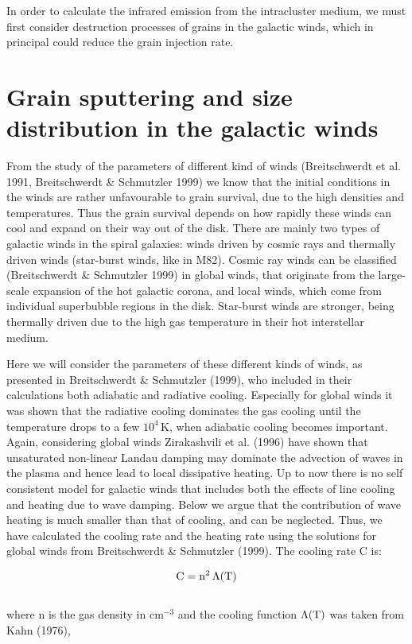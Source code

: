 \documentclass[]{aa}
\begin{document}
In order to  calculate the infrared emission from the intracluster medium, we 
must first consider destruction processes of grains in the galactic winds, 
which in principal could  reduce the grain injection rate.
 
\section{Grain sputtering and size distribution in the galactic winds}

From the study of the parameters of different kind of winds
(Breitschwerdt et al. 1991, Breitschwerdt \& Schmutzler 1999) we know that 
the initial conditions in the
winds are rather unfavourable to grain survival, due to the high densities and
temperatures. Thus the grain survival depends on how rapidly these winds can 
cool
and expand on their way out of the disk. There are mainly two types of galactic
winds in the spiral galaxies: winds driven by cosmic rays and
thermally driven winds (star-burst winds, like in M82). Cosmic
ray winds can be classified (Breitschwerdt \& Schmutzler 1999) in global 
winds, 
that originate from the large-scale expansion of the hot galactic corona, and 
local winds, which come from individual superbubble regions in the disk. 
Star-burst winds are stronger, being thermally driven due to the high gas 
temperature in their hot interstellar medium. 

Here we will consider the parameters of these 
different kinds of winds, as presented
in Breitschwerdt \& Schmutzler (1999), who included in their calculations 
both adiabatic and
radiative cooling. Especially for global winds it was shown that the radiative
cooling dominates the gas cooling until the temperature drops to a few 
$10^4$\,K,
when adiabatic cooling becomes important. Again, considering global winds 
Zirakashvili et al. (1996) have
shown that unsaturated non-linear Landau damping may dominate the advection of
waves in the plasma and hence lead to local dissipative heating. Up to now
there is no self consistent model for galactic winds that includes both the
effects of line cooling and heating due to wave damping. Below we argue that 
the contribution of wave heating is much smaller than that of cooling, and
can be neglected. Thus, we have calculated the cooling rate and the
heating rate using the solutions for global winds from 
Breitschwerdt \& Schmutzler (1999). The cooling rate C is:

\begin{eqnarray}
{\rm C} = {\rm n}^2\,\Lambda({\rm T})
\end{eqnarray}
\\
where n is the gas density in cm$^{-3}$ and the cooling function 
$\Lambda({\rm T})$ was taken from Kahn (1976), 
\end{document}
